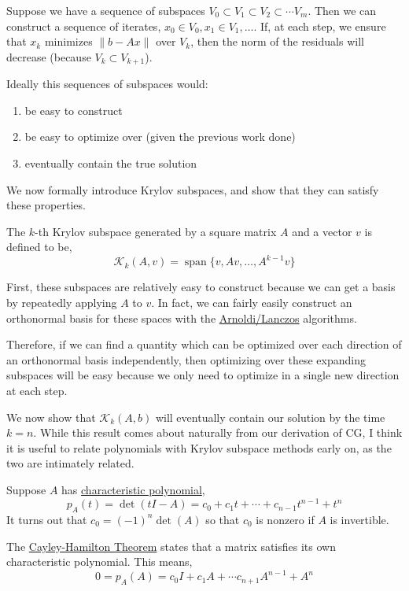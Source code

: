 Suppose we have a sequence of subspaces
\(V_0\subset V_1\subset V_2\subset \cdots V_m\). Then we can construct a
sequence of iterates, \(x_0\in V_0, x_1\in V_1,\ldots\). If, at each
step, we ensure that \(x_k\) minimizes \(\|b-Ax\|\) over \(V_k\), then
the norm of the residuals will decrease (because
\(V_k \subset V_{k+1}\)).

Ideally this sequences of subspaces would:

\begin{enumerate}
\def\labelenumi{\arabic{enumi}.}
\tightlist
\item
  be easy to construct
\item
  be easy to optimize over (given the previous work done)
\item
  eventually contain the true solution
\end{enumerate}

We now formally introduce Krylov subspaces, and show that they can
satisfy these properties.

The \(k\)-th Krylov subspace generated by a square matrix \(A\) and a
vector \(v\) is defined to be, \[
\mathcal{K}_k(A,v) = \operatorname{span}\{v,Av,\ldots,A^{k-1}v \}
\]

First, these subspaces are relatively easy to construct because we can
get a basis by repeatedly applying \(A\) to \(v\). In fact, we can
fairly easily construct an orthonormal basis for these spaces with the
\href{./arnoldi_lanczos.html}{Arnoldi/Lanczos} algorithms.

Therefore, if we can find a quantity which can be optimized over each
direction of an orthonormal basis independently, then optimizing over
these expanding subspaces will be easy because we only need to optimize
in a single new direction at each step.

We now show that \(\mathcal{K}_k(A,b)\) will eventually contain our
solution by the time \(k=n\). While this result comes about naturally
from our derivation of CG, I think it is useful to relate polynomials
with Krylov subspace methods early on, as the two are intimately
related.

Suppose \(A\) has
\href{https://en.wikipedia.org/wiki/Characteristic_polynomial\#Characteristic_equation}{characteristic
polynomial}, \[
p_A(t) = \det(tI-A) = c_0 + c_1t + \cdots + c_{n-1}t^{n-1} + t^n
\] It turns out that \(c_0 = (-1)^n\det(A)\) so that \(c_0\) is nonzero
if \(A\) is invertible.

The
\href{https://en.wikipedia.org/wiki/Cayley\%E2\%80\%93Hamilton_theorem}{Cayley-Hamilton
Theorem} states that a matrix satisfies its own characteristic
polynomial. This means, \[
0 = p_A(A) = c_0 I + c_1 A + \cdots c_{n+1} A^{n-1} + A^n
\]

